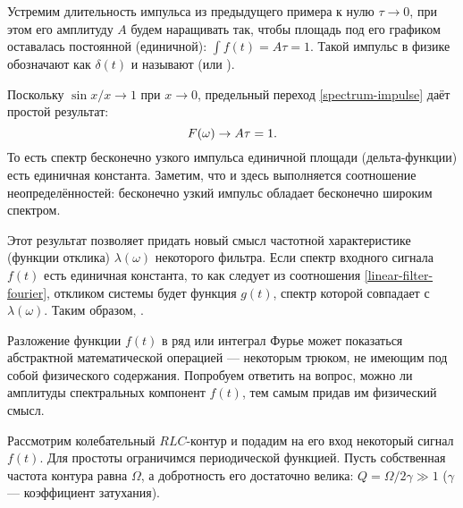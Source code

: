 \begin{lab:example}\label{example:delta}
Устремим длительность импульса из предыдущего примера к нулю $\tau\to 0$,
при этом его амплитуду $A$ будем наращивать так, чтобы площадь
под его графиком оставалась постоянной (единичной): $\int f(t) = A \tau = 1$.
Такой импульс в физике обозначают как $\delta(t)$ и называют 
(или ).

Поскольку $\sin x/x\to 1$ при $x\to 0$,
предельный переход \eqref{spectrum-impulse} даёт простой результат:
\begin{equation}
    \eqmark{spectrum-delta}
    F(\omega)\to A\tau =1.
\end{equation}
То есть спектр бесконечно узкого импульса единичной площади (дельта-функции)
есть единичная константа. Заметим, что и здесь выполняется соотношение
неопределённостей: бесконечно узкий импульс 
обладает бесконечно широким спектром.

Этот результат позволяет придать новый смысл частотной характеристике
(функции отклика) $\lambda(\omega)$ некоторого фильтра.
Если спектр входного сигнала $f(t)$ есть единичная константа,
то как следует из соотношения \eqref{linear-filter-fourier},
откликом системы будет функция $g(t)$, спектр которой совпадает
с $\lambda(\omega)$. Таким образом, .
\end{lab:example}


\label{sec:spectrum-meaning}

Разложение функции $f(t)$ в ряд или интеграл Фурье может показаться
абстрактной математической операцией --- некоторым трюком, не имеющим
под собой физического содержания. Попробуем ответить на вопрос,
можно ли  амплитуды спектральных компонент $f(t)$,
тем самым придав им физический смысл.

Рассмотрим колебательный $RLC$-контур и подадим на его вход некоторый сигнал $f(t)$.
Для простоты ограничимся периодической функцией.
Пусть собственная частота контура равна $\Omega$, а добротность его
достаточно велика: $Q=\Omega/2\gamma \gg 1$ ($\gamma$ --- коэффициент затухания).

